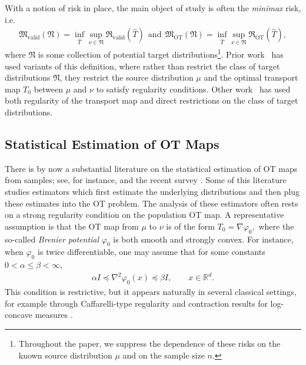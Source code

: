 \documentclass[11pt,twoside]{article}
\newcommand{\rot}{\mathfrak{R}_{\text{OT}}}
\newcommand{\rvalid}{\mathfrak{R}_{\text{valid}}}
\newcommand{\targetclass}{\mathfrak{N}}
\newcommand{\validminimaxrisk}{\mathfrak{M}_{\text{valid}}}
\newcommand{\otminimaxrisk}{\mathfrak{M}_{\text{OT}}}
\begin{document}
With a notion of risk in place, the main object of study is often the \emph{minimax} risk, i.e.
\begin{align*}
\validminimaxrisk(\targetclass) = \inf_{\widehat{T}} \sup_{\nu \in \targetclass} \rvalid(\widehat{T})~~\text{and}~~\otminimaxrisk(\targetclass) = \inf_{\widehat{T}} \sup_{\nu \in \targetclass} \rot(\widehat{T}),
\end{align*}
where $\targetclass$ is some collection of potential target distributions\footnote{Throughout the paper, we suppress the dependence of these risks on the known source distribution $\mu$ and on the sample size $n$.}.
Prior work~\citep{hutter2021, divol2022a} has used variants of this definition, where rather than restrict the class of target distributions $\targetclass$, they restrict the source distribution $\mu$ and the optimal transport map $T_0$ between $\mu$ and $\nu$ to satisfy regularity conditions. 
Other work~\citep{manole2024plugin,balakrishnan2026stability} has used both regularity of the transport map and direct restrictions on the class of target distributions.

\subsection{Statistical Estimation of OT Maps}
There is by now a substantial literature on the statistical estimation of OT maps from samples; see, for instance, \cite{manole2024plugin,deb2021,hutter2021} and the recent survey \cite{balakrishnan2025statistical}. Some of this literature studies estimators which first estimate the underlying distributions and then plug these estimates into the OT problem. The analysis of these estimators often rests on a strong regularity condition on the population OT map. A representative assumption is that the OT map from $\mu$ to $\nu$ is of the form
$T_0 = \nabla \varphi_0,$
where the so-called \emph{Brenier potential} $\varphi_0$ is both smooth and strongly convex. For instance, when $\varphi_0$ is twice differentiable, one may assume that for some constants $0 < \alpha \leq \beta < \infty$,
\begin{align*}
\alpha I \preceq \nabla^2 \varphi_0(x) \preceq \beta I, \qquad x \in \mathbb{R}^d.
\end{align*}
This condition is restrictive, but it appears naturally in several classical settings, for example through Caffarelli-type regularity and contraction results for log-concave measures \cite{caffarelli1992regularity,figalli2017monge}.
\end{document}

